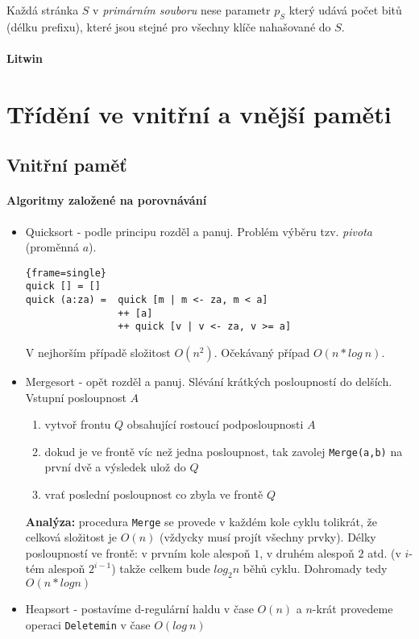 \documentclass[a4paper]{article}      %
\begin{document}
Každá stránka $S$ v \emph{primárním souboru} nese parametr $p_{S}$ který udává počet bitů (délku prefixu), které jsou stejné pro všechny klíče
nahašované do $S$.

\paragraph{Litwin}

\section{Třídění ve vnitřní a vnější paměti}

\subsection{Vnitřní paměť}
\paragraph{Algoritmy založené na porovnávání}
\begin{itemize}
\item Quicksort - podle principu rozděl a panuj. Problém výběru tzv. \emph{pivota} (proměnná $a$).
	\lstset{
	basicstyle=\small,
	stringstyle=\ttfamily,
	columns=fixed,
	basewidth=0.50em,
	breaklines=true,
	breakautoindent=true,
	language=haskell}
\begin{lstlisting}{frame=single}
quick [] = []
quick (a:za) =  quick [m | m <- za, m < a]
                ++ [a]
                ++ quick [v | v <- za, v >= a]
\end{lstlisting}
V nejhorším případě složitost $O(n^2)$. Očekávaný případ $O(n*log\ n)$.
\item Mergesort - opět rozděl a panuj. Slévání krátkých posloupností do delších. Vstupní posloupnost $A$
	\begin{enumerate}
	\item vytvoř frontu $Q$ obsahující rostoucí podposloupnosti $A$
	\item dokud je ve frontě víc než jedna posloupnost, tak zavolej \verb+Merge(a,b)+ na první dvě a výsledek ulož do $Q$
	\item vrať poslední posloupnost co zbyla ve frontě $Q$
	\end{enumerate}
\textbf{Analýza:} procedura \verb+Merge+ se provede v každém kole cyklu tolikrát, že celková složitost je $O(n)$
(vždycky musí projít všechny prvky). Délky posloupností ve frontě: v prvním kole alespoň $1$, v druhém alespoň $2$ atd.
(v $i$-tém alespoň $2^{i-1}$) takže celkem bude $log_{2} n$ běhů cyklu. Dohromady tedy $O(n*log n)$
\item Heapsort - postavíme d-regulární haldu v čase $O(n)$ a $n$-krát provedeme operaci \verb+Deletemin+ v čase $O(log\ n)$
\end{itemize}
\end{document}
